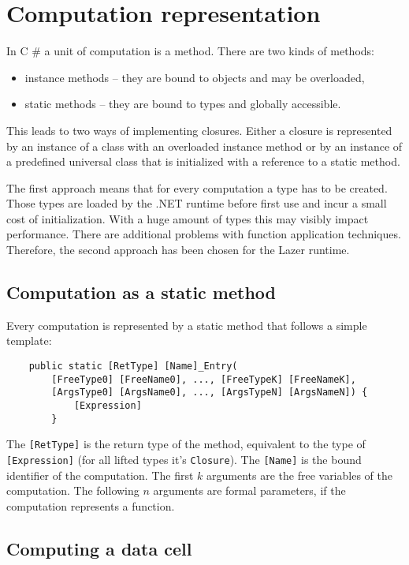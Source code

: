 \documentclass[en]{pracamgr}
\newcommand{\shrp}{%
  {\fontfamily{ppl}\selectfont\#%
  }}
\begin{document}
\section{Computation representation}\label{s:computations}

In C\shrp{} a unit of computation is a method.
There are two kinds of methods:
\begin{itemize}
    \item instance methods -- they are bound to objects and may be overloaded,
    \item static methods -- they are bound to types and globally accessible.
\end{itemize}
This leads to two ways of implementing closures.
Either a closure is represented by an instance of a class with an
overloaded instance method or by an instance of a predefined universal
class that is initialized with a reference to a static method.

The first approach means that for every computation a type has to be created.
Those types are loaded by the .NET runtime before first use and incur a small
cost of initialization. With a huge amount of types this may visibly impact performance.
There are additional problems with function application techniques.
Therefore, the second approach has been chosen for the Lazer runtime.

\subsection{Computation as a static method}

Every computation is represented by a static method that follows a simple template:

\begin{verbatim}
    public static [RetType] [Name]_Entry(
        [FreeType0] [FreeName0], ..., [FreeTypeK] [FreeNameK],
        [ArgsType0] [ArgsName0], ..., [ArgsTypeN] [ArgsNameN]) {
            [Expression]
        }
\end{verbatim}

The \verb|[RetType]| is the return type of the method,
equivalent to the type of \verb|[Expression]|
(for all lifted types it's \texttt{Closure}).
The \verb|[Name]| is the bound identifier of the computation.
The first $k$ arguments are the free variables of the computation.
The following $n$ arguments are formal parameters, if the computation represents a function.

\subsection{Computing a data cell}\label{s:compute_data}
\end{document}

